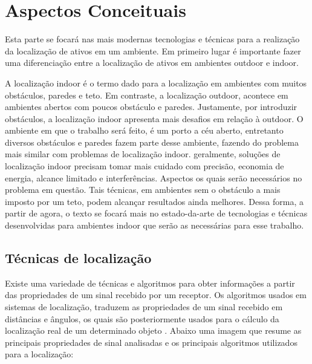 \chapter{Aspectos Conceituais} 
Esta parte se focará nas mais modernas tecnologias e técnicas para a realização da localização de ativos em um ambiente. Em primeiro lugar é importante fazer uma diferenciação entre a localização de ativos em ambientes outdoor e indoor.

A localização indoor é o termo dado para a localização em ambientes com muitos obstáculos, paredes e teto. Em contraste, a localização outdoor, acontece em ambientes abertos com poucos obstáculo e paredes. Justamente, por introduzir obstáculos, a localização indoor apresenta mais desafios em relação à outdoor. O ambiente em que o trabalho será feito, é um porto a céu aberto, entretanto diversos obstáculos e paredes fazem parte desse ambiente, fazendo do problema mais similar com problemas de localização indoor. geralmente, soluções de localização indoor precisam tomar mais cuidado com precisão, economia de energia, alcance limitado e interferências. Aspectos os quais serão necessários no problema em questão. Tais técnicas, em ambientes sem o obstáculo a mais imposto por um teto, podem alcançar resultados ainda melhores. Dessa forma, a partir de agora, o texto se focará mais no estado-da-arte de tecnologias e técnicas desenvolvidas para ambientes indoor que serão as necessárias para esse trabalho.

\section{Técnicas de localização}
Existe uma variedade de técnicas e algoritmos para obter informações a partir das propriedades de um sinal recebido por um receptor. Os algoritmos usados em sistemas de localização, traduzem as propriedades de um sinal recebido em distâncias e ângulos, os quais são posteriormente usados para o cálculo da localização real de um determinado objeto \cite{art5}. Abaixo uma imagem que resume as principais propriedades de sinal analisadas e os principais algoritmos utilizados para a localização:


